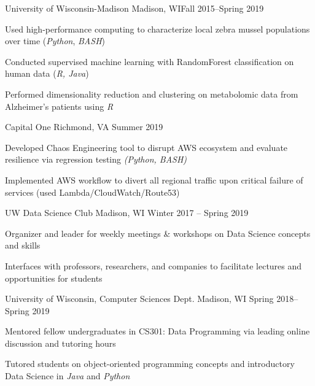 \documentclass[10pt, letterpaper]{awesome-cv}
\newcommand{\col}{awesome-red}
\newcommand{\regcol}{\textcolor{\col}}
\begin{document}
        {University of Wisconsin-Madison}
        {Madison, WI}{Fall 2015--Spring 2019}
        {\begin{cvitems} \setlength{\itemindent}{1em}
            \item Used high-performance computing to characterize local zebra mussel populations over time (\textit{Python}, \textit{BASH})
            \item Conducted supervised machine learning with RandomForest classification on human data (\textit{R, Java})
            \item Performed dimensionality reduction and clustering on metabolomic data from Alzheimer's patients using \textit{R}
        \end{cvitems}}
    
\cvsubsection{\regcol{Vocational}}
\hspace*{0em}
    {Capital One}
    {Richmond, VA}
    {Summer 2019}
    {\begin{cvitems} \setlength{\itemindent}{1em}
        \item Developed Chaos Engineering tool to disrupt AWS ecosystem and evaluate resilience via regression testing \textit{(Python, BASH)}
        \item Implemented AWS workflow to divert all regional traffic upon critical failure of services (used Lambda/CloudWatch/Route53)
    \end{cvitems}}
    \vspace*{-0.7em}

\hspace*{0em}
    {UW Data Science Club}
    {Madison, WI}
    {Winter 2017 -- Spring 2019}
    {\begin{cvitems} \setlength{\itemindent}{1em}
        \item Organizer and leader for weekly meetings \& workshops on Data Science concepts and skills
        \item Interfaces with professors, researchers, and companies to facilitate lectures and opportunities for students
    \end{cvitems}}
    \vspace*{-0.7em}
    
\hspace*{0em}
    {University of Wisconsin, Computer Sciences Dept.}
    {Madison, WI}
    {Spring 2018--Spring 2019}
    {\begin{cvitems} \setlength{\itemindent}{1em}
      \item Mentored fellow undergraduates in CS301: Data Programming via leading online discussion and tutoring hours
      \item Tutored students on object-oriented programming concepts and introductory Data Science in \textit{Java} and \textit{Python}
    \end{cvitems}}  
    
\end{document}
